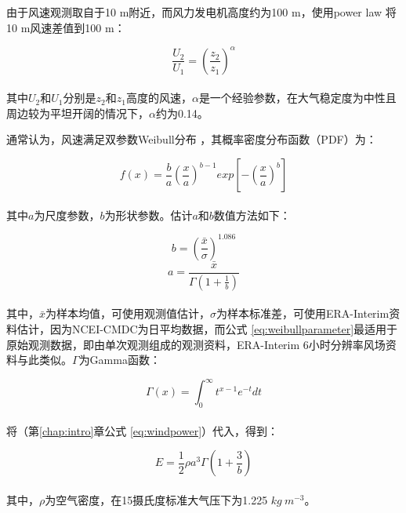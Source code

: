 由于风速观测取自于10 m附近，而风力发电机高度约为100 m，使用power law \citep{peterson1978on}将10 m风速差值到100 m：

\begin{equation} \label{eq:powerlaw}
\frac{U_{2}}{U_{1}} = \left( \frac{z_{2}}{z_{1}} \right)^{\alpha}
\end{equation} ~\\
其中$U_{2}$和$U_{1}$分别是$z_{2}$和$z_{1}$高度的风速，$\alpha$是一个经验参数，在大气稳定度为中性且周边较为平坦开阔的情况下，$\alpha$约为0.14。

通常认为，风速满足双参数Weibull分布 \citep{pryor2010climate}，其概率密度分布函数（PDF）为：

\begin{equation} \label{eq:weibull}
f(x) = \frac{b}{a} \left( \frac{x}{a} \right)^{b-1} exp \left[-\left(\frac{x}{a} \right)^{b} \right]
\end{equation} ~\\
其中$a$为尺度参数，$b$为形状参数。估计$a$和$b$数值方法如下\citep{monahan2006the1,monahan2006the2}：

\begin{equation} \label{eq:weibullparameter}
b = \left(\frac{\bar{x}}{\sigma} \right)^{1.086}
\end{equation}  
\vspace*{1ex}  
\begin{equation} \label{eq:weibullparameter2}
a = \frac{\bar{x}}{\Gamma \left(1 + \frac{1}{b} \right)}
\end{equation} ~\\
其中，$\bar{x}$为样本均值，可使用观测值估计，$\sigma$为样本标准差，可使用ERA-Interim资料估计，因为NCEI-CMDC为日平均数据，而公式 \ref{eq:weibullparameter}最适用于原始观测数据，即由单次观测组成的观测资料，ERA-Interim 6小时分辨率风场资料与此类似。$\Gamma$为Gamma函数：

\begin{equation} \label{eq:gammafunction}
\Gamma(x) = \int_{0}^{\infty} t^{x - 1} e^{-t} dt 
\end{equation} ~\\
将（第\ref{chap:intro}章公式  \ref{eq:windpower}）代入，得到：

\begin{equation} \label{eq:windpowerwithweibull}
E = \frac{1}{2} \rho a^{3} \Gamma \left( 1 + \frac{3}{b} \right)
\end{equation} ~\\
其中，$\rho$为空气密度，在15摄氏度标准大气压下为1.225 $kg ~ m^{-3}$。

